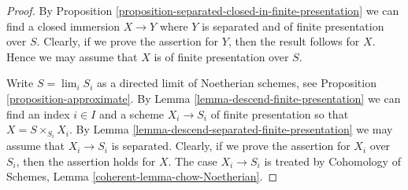 \documentclass[10pt,a4paper]{amsart}
\theoremstyle{plain}
\theoremstyle{definition}
\theoremstyle{remark}
\numberwithin{equation}{subsection}
\def\lim{\mathop{\mathrm{lim}}\nolimits}
\begin{document}
\begin{proof}
By Proposition \ref{proposition-separated-closed-in-finite-presentation}
we can find a closed immersion $X \to Y$ where $Y$ is separated
and of finite presentation over $S$. Clearly, if we prove the assertion
for $Y$, then the result follows for $X$. Hence we may assume that
$X$ is of finite presentation over $S$.

\medskip\noindent
Write $S = \lim_i S_i$ as a directed limit of Noetherian schemes, see
Proposition \ref{proposition-approximate}. By
Lemma \ref{lemma-descend-finite-presentation} we can
find an index $i \in I$ and a scheme $X_i \to S_i$ of finite presentation
so that $X = S \times_{S_i} X_i$.
By Lemma \ref{lemma-descend-separated-finite-presentation}
we may assume that $X_i \to S_i$ is separated.
Clearly, if we prove the assertion for
$X_i$ over $S_i$, then the assertion holds for $X$. The case
$X_i \to S_i$ is treated by
Cohomology of Schemes, Lemma \ref{coherent-lemma-chow-Noetherian}.
\end{proof}
\end{document}
